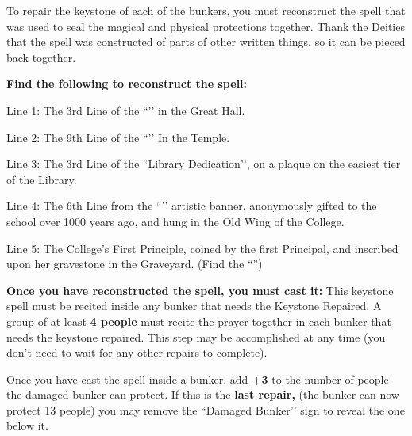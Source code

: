 \documentclass[green]{GL2020}
\begin{document}
\name{\gKeystone{}}

To repair the keystone of each of the bunkers, you must reconstruct the spell that was used to seal the magical and physical protections together. Thank the Deities that the spell was constructed of parts of other written things, so it can be pieced back together.

\textbf{Find the following to reconstruct the spell:}

Line 1: The 3rd Line of the ``\sTeachersOath{}’’ in the Great Hall.\\
\vspace{3cm}

Line 2: The 9th Line of the ``\sAppeal{}’’ In the Temple.\\
\vspace{3cm}

Line 3: The 3rd Line of the ``Library Dedication’’, on a plaque on the easiest tier of the Library.\\
\vspace{3cm}

Line 4: The 6th Line from the ``\sBlackCrocusWishOne{}’’ artistic banner, anonymously gifted to the school over 1000 years ago, and hung in the Old Wing of the College.\\
\vspace{3cm}

Line 5: The College’s First Principle, coined by the first Principal, and inscribed upon her gravestone in the Graveyard. (Find the ``\sTombOfFirstPrincipal{}'')\\
\vspace{3cm}

\textbf{Once you have reconstructed the spell, you must cast it:}
This keystone spell must be recited inside any bunker that needs the Keystone Repaired. A group of at least \textbf{4 people} must recite the prayer together in each bunker that needs the keystone repaired. This step may be accomplished at any time (you don’t need to wait for any other repairs to complete).

Once you have cast the spell inside a bunker, add \textbf{+3} to the number of people the damaged bunker can protect. If this is the \textbf{last repair,} (the bunker can now protect 13 people) you may remove the ``Damaged Bunker’’ sign to reveal the one below it.
\end{document}
